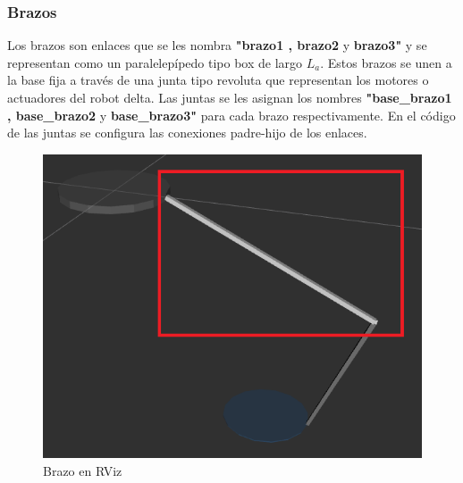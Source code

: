       \newpage

       \subsubsection{Brazos}
        Los brazos son enlaces que se les nombra \textbf{"brazo1 , brazo2} y \textbf{brazo3"} y se representan como un paralelepípedo tipo box de largo \textbf{$L_a$}. Estos brazos se unen a la base fija a través de una junta tipo revoluta que representan los motores o actuadores del robot delta. Las juntas se les asignan los nombres \textbf{"base\_brazo1 , base\_brazo2} y \textbf{base\_brazo3"} para cada brazo respectivamente. En el código de las juntas se configura las conexiones padre-hijo de los enlaces.
        
        
             \begin{figure}[h]
                \centering
                \includegraphics[width=0.4\linewidth]{Main/Chapter6/Images6/cap6_brazo.png}
                \caption{Brazo en RViz}
                \label{f:Cap6_urdf_2}
            \end{figure}  
            

